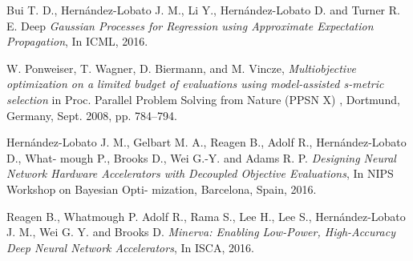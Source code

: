 \documentclass[a4paper, 11pt]{article}
\begin{document}
\begin{thebibliography}{9}
Bui T. D., Hern\'andez-Lobato J. M., Li Y., Hern\'andez-Lobato D. and Turner R. E. Deep
\textit{Gaussian Processes for Regression using Approximate Expectation Propagation}, In ICML,
2016.
 
W. Ponweiser, T. Wagner, D. Biermann, and M. Vincze,  
\textit{Multiobjective optimization on a limited budget of evaluations using model-assisted s-metric selection} in Proc. Parallel Problem Solving from Nature (PPSN X) , Dortmund, Germany, Sept. 2008, pp. 784–794. 

Hern\'andez-Lobato J. M., Gelbart M. A., Reagen B., Adolf R., Hern\'andez-Lobato D., What-
mough P., Brooks D., Wei G.-Y. and Adams R. P. \textit{Designing Neural Network Hardware
Accelerators with Decoupled Objective Evaluations}, In NIPS Workshop on Bayesian Opti-
mization, Barcelona, Spain, 2016.

Reagen B., Whatmough P. Adolf R., Rama S., Lee H., Lee S., Hern\'andez-Lobato J. M., Wei
G. Y. and Brooks D. \textit{Minerva: Enabling Low-Power, High-Accuracy Deep Neural Network
Accelerators}, In ISCA, 2016.
\end{thebibliography}
\end{document}
